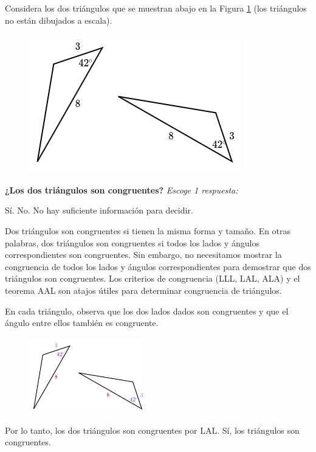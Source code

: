 \question[5] Considera los dos triángulos que se muestran abajo en la Figura \ref{fig:20230323154930} (los triángulos no están dibujados a escala).

\begin{figure}[H]
    \includegraphics[width=0.5\linewidth]{../images/20230323154930}
    \caption{}
    \label{fig:20230323154930}
\end{figure}

\textbf{¿Los dos triángulos son congruentes?}
\emph{Escoge 1 respuesta:}

\begin{choices}
    \CorrectChoice Sí.
    \choice No.
    \choice No hay suficiente información para decidir.
\end{choices}

\begin{solutionbox}{5cm}
    Dos triángulos son congruentes si tienen la misma forma y tamaño. En otras palabras, dos triángulos son congruentes si todos los lados y ángulos correspondientes son congruentes.
    Sin embargo, no necesitamos mostrar la congruencia de todos los lados y ángulos correspondientes para demostrar que dos triángulos son congruentes. Los criterios de congruencia (LLL, LAL, ALA) y el teorema AAL son atajos útiles para determinar congruencia de triángulos.

    En cada triángulo, observa que los dos lados dados son congruentes y que el ángulo entre ellos también es congruente.
    \begin{figure}[H]
        \includegraphics[width=0.45\textwidth]{../images/20230323155107}
        \caption{}
        \label{fig:20230323155107}
    \end{figure}

    Por lo tanto, los dos triángulos son congruentes por LAL.
    Sí, los triángulos son congruentes.
\end{solutionbox}